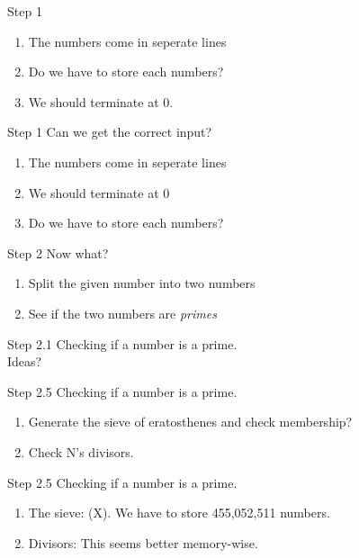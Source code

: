 \documentclass{beamer}
\begin{document}
\begin{frame}{Step 1}
  \begin{enumerate}
    \item The numbers come in seperate lines
    \item Do we have to store each numbers?
    \item We should terminate at 0.
  \end{enumerate}
\end{frame}

\begin{frame}{Step 1}
  Can we get the correct input?
  \begin{enumerate}
    \item The numbers come in seperate lines
    \item We should terminate at 0
    \item Do we have to store each numbers?
  \end{enumerate}
\end{frame}

\begin{frame}{Step 2}
  Now what?
  \begin{enumerate}
    \item Split the given number into two numbers
    \item See if the two numbers are \textit{primes}
  \end{enumerate}
\end{frame}

\begin{frame}{Step 2.1}
  Checking if a number is a prime.\\
  Ideas?
\end{frame}

\begin{frame}{Step 2.5}
  Checking if a number is a prime.
  \begin{enumerate}
    \item Generate the sieve of eratosthenes and check membership?
    \item Check N's divisors.
  \end{enumerate}
\end{frame}

\begin{frame}{Step 2.5}
  Checking if a number is a prime.
  \begin{enumerate}
    \item The sieve: (X). We have to store 455,052,511 numbers.
    \item Divisors: This seems better memory-wise.
  \end{enumerate}
\end{frame}
\end{document}
